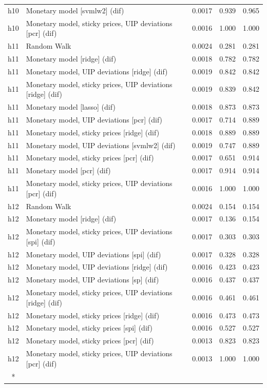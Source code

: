 \begin{ThreePartTable}
\begin{longtable}[t]{cp{5.5cm}ccc}
h10 & \raggedright Monetary model [svmlw2] (dif) & 0.0017 & 0.939 & 0.965\\
h10 & \raggedright Monetary model, sticky prices, UIP deviations [pcr] (dif) & 0.0016 & 1.000 & 1.000\\
\addlinespace
h11 & \raggedright Random Walk & 0.0024 & 0.281 & 0.281\\
h11 & \raggedright Monetary model [ridge] (dif) & 0.0018 & 0.782 & 0.782\\
h11 & \raggedright Monetary model, UIP deviations [ridge] (dif) & 0.0019 & 0.842 & 0.842\\
h11 & \raggedright Monetary model, sticky prices, UIP deviations [ridge] (dif) & 0.0019 & 0.839 & 0.842\\
h11 & \raggedright Monetary model [lasso] (dif) & 0.0018 & 0.873 & 0.873\\
h11 & \raggedright Monetary model, UIP deviations [pcr] (dif) & 0.0017 & 0.714 & 0.889\\
h11 & \raggedright Monetary model, sticky prices [ridge] (dif) & 0.0018 & 0.889 & 0.889\\
h11 & \raggedright Monetary model, UIP deviations [svmlw2] (dif) & 0.0019 & 0.747 & 0.889\\
h11 & \raggedright Monetary model, sticky prices [pcr] (dif) & 0.0017 & 0.651 & 0.914\\
h11 & \raggedright Monetary model [pcr] (dif) & 0.0017 & 0.914 & 0.914\\
h11 & \raggedright Monetary model, sticky prices, UIP deviations [pcr] (dif) & 0.0016 & 1.000 & 1.000\\
\addlinespace
h12 & \raggedright Random Walk & 0.0024 & 0.154 & 0.154\\
h12 & \raggedright Monetary model [ridge] (dif) & 0.0017 & 0.136 & 0.154\\
h12 & \raggedright Monetary model, sticky prices, UIP deviations [spi] (dif) & 0.0017 & 0.303 & 0.303\\
h12 & \raggedright Monetary model, UIP deviations [spi] (dif) & 0.0017 & 0.328 & 0.328\\
h12 & \raggedright Monetary model, UIP deviations [ridge] (dif) & 0.0016 & 0.423 & 0.423\\
h12 & \raggedright Monetary model, UIP deviations [sp] (dif) & 0.0016 & 0.437 & 0.437\\
h12 & \raggedright Monetary model, sticky prices, UIP deviations [ridge] (dif) & 0.0016 & 0.461 & 0.461\\
h12 & \raggedright Monetary model, sticky prices [ridge] (dif) & 0.0016 & 0.473 & 0.473\\
h12 & \raggedright Monetary model, sticky prices [spi] (dif) & 0.0016 & 0.527 & 0.527\\
h12 & \raggedright Monetary model, sticky prices [pcr] (dif) & 0.0013 & 0.823 & 0.823\\
h12 & \raggedright Monetary model, sticky prices, UIP deviations [pcr] (dif) & 0.0013 & 1.000 & 1.000\\*
\end{longtable}
\end{ThreePartTable}
\endgroup{}
